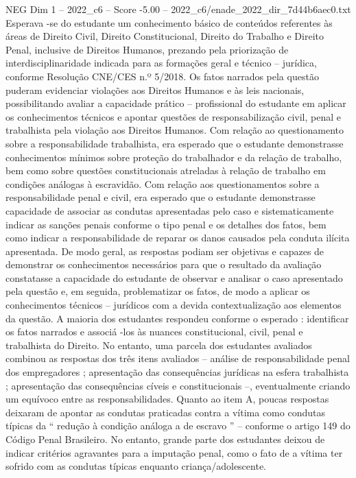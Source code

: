 \begin{textsample}{NEG Dim 1 – 2022\_c6 – Score -5.00 – 2022\_c6/enade\_2022\_dir\_7d44b6aec0.txt}
Esperava -se do estudante um conhecimento básico de conteúdos referentes às áreas de Direito Civil, Direito Constitucional, Direito do Trabalho e Direito Penal, inclusive de Direitos Humanos, prezando pela priorização de interdisciplinaridade indicada para as formações geral e técnico – jurídica, conforme Resolução CNE/CES n.º 5/2018.
Os fatos narrados pela questão puderam evidenciar violações aos Direitos Humanos e às leis nacionais, possibilitando avaliar a capacidade prático – profissional do estudante em aplicar os conhecimentos técnicos e apontar questões de responsabilização civil, penal e trabalhista pela violação aos Direitos Humanos.
Com relação ao questionamento sobre a responsabilidade trabalhista, era esperado que o estudante demonstrasse conhecimentos mínimos sobre proteção do trabalhador e da relação de trabalho, bem como sobre questões constitucionais atreladas à relação de trabalho em condições análogas à escravidão.
Com relação aos questionamentos sobre a responsabilidade penal e civil, era esperado que o estudante demonstrasse capacidade de associar as condutas apresentadas pelo caso e sistematicamente indicar as sanções penais conforme o tipo penal e os detalhes dos fatos, bem como indicar a responsabilidade de reparar os danos causados pela conduta ilícita apresentada.
De modo geral, as respostas podiam ser objetivas e capazes de demonstrar os conhecimentos necessários para que o resultado da avaliação constatasse a capacidade do estudante de observar e analisar o caso apresentado pela questão e, em seguida, problematizar os fatos, de modo a aplicar os conhecimentos técnicos – jurídicos com a devida contextualização aos elementos da questão.
A maioria dos estudantes respondeu conforme o esperado : identificar os fatos narrados e associá -los às nuances constitucional, civil, penal e trabalhista do Direito.
No entanto, uma parcela dos estudantes avaliados combinou as respostas dos três itens avaliados – análise de responsabilidade penal dos empregadores ; apresentação das consequências jurídicas na esfera trabalhista ; apresentação das consequências cíveis e constitucionais –, eventualmente criando um equívoco entre as responsabilidades.
Quanto ao item A, poucas respostas deixaram de apontar as condutas praticadas contra a vítima como condutas típicas da “ redução à condição análoga a de escravo ” – conforme o artigo 149 do Código Penal Brasileiro.
No entanto, grande parte dos estudantes deixou de indicar critérios agravantes para a imputação penal, como o fato de a vítima ter sofrido com as condutas típicas enquanto criança/adolescente.

\end{textsample}
